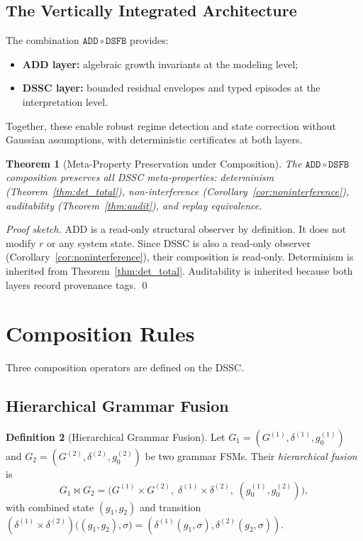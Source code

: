 \documentclass[11pt,a4paper]{article}
\theoremstyle{plain}
\newtheorem{theorem}{Theorem}[section]
\theoremstyle{definition}
\newtheorem{definition}[theorem]{Definition}
\theoremstyle{remark}
\begin{document}
\subsection{The Vertically Integrated Architecture}

The combination $\mathtt{ADD} \circ \mathtt{DSFB}$ provides:
\begin{itemize}[nosep]
  \item \textbf{ADD layer:} algebraic growth invariants at the modeling level;
  \item \textbf{DSSC layer:} bounded residual envelopes and typed episodes at the interpretation level.
\end{itemize}
Together, these enable robust regime detection and state correction without Gaussian assumptions,
with deterministic certificates at both layers.

\begin{theorem}[Meta-Property Preservation under Composition]
\label{thm:meta_preservation}
  The $\mathtt{ADD} \circ \mathtt{DSFB}$ composition preserves all DSSC meta-properties:
  determinism (Theorem~\ref{thm:det_total}), non-interference (Corollary~\ref{cor:noninterference}),
  auditability (Theorem~\ref{thm:audit}), and replay equivalence.
\end{theorem}
\begin{proof}[Proof sketch]
  ADD is a read-only structural observer by definition. It does not modify $r$ or any system
  state. Since DSSC is also a read-only observer (Corollary~\ref{cor:noninterference}), their
  composition is read-only. Determinism is inherited from Theorem~\ref{thm:det_total}.
  Auditability is inherited because both layers record provenance tags. \qed
\end{proof}

\section{Composition Rules}
\label{sec:composition}

Three composition operators are defined on the DSSC.

\subsection{Hierarchical Grammar Fusion}

\begin{definition}[Hierarchical Grammar Fusion]
  Let $G_1 = (G^{(1)}, \delta^{(1)}, g_0^{(1)})$ and $G_2 = (G^{(2)}, \delta^{(2)}, g_0^{(2)})$
  be two grammar FSMs. Their \emph{hierarchical fusion} is
  \begin{equation}
    G_1 \bowtie G_2 = \bigl(G^{(1)} \times G^{(2)},\; \delta^{(1)} \times \delta^{(2)},\;
      (g_0^{(1)}, g_0^{(2)})\bigr),
  \end{equation}
  with combined state $(g_1, g_2)$ and transition
  $(\delta^{(1)} \times \delta^{(2)})\bigl((g_1, g_2), \sigma\bigr) =
  (\delta^{(1)}(g_1, \sigma), \delta^{(2)}(g_2, \sigma))$.
\end{definition}
\end{document}
